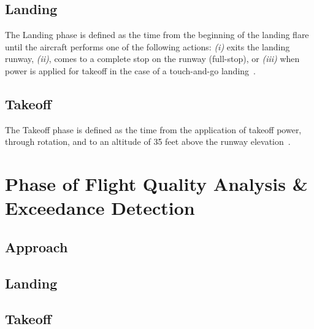     
    \subsection{Landing}
    
    The Landing phase is defined as the time from the beginning of the landing flare until the aircraft performs one of the following actions: \textit{(i)} exits the landing runway, \textit{(ii)}, comes to a complete stop on the runway (full-stop), or \textit{(iii)} when power is applied for takeoff in the case of a touch-and-go landing~\cite{cictt2013phase}.
    
    
    \subsection{Takeoff}
    
    The Takeoff phase is defined as the time from the application of takeoff power, through rotation, and to an altitude of 35 feet above the runway elevation~\cite{cictt2013phase}.
    

\section{Phase of Flight Quality Analysis \& Exceedance Detection}
    
	\subsection{Approach}
    
    
    \subsection{Landing}
    
    
    \subsection{Takeoff}
    

